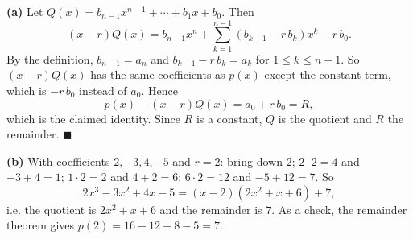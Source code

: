 \textbf{(a)} Let $Q(x)=b_{n-1}x^{n-1}+\cdots+b_1x+b_0$. Then
\[(x-r)Q(x)=b_{n-1}x^n+\sum_{k=1}^{n-1}\left(b_{k-1}-r\,b_k\right)x^k-r\,b_0.\]
By the definition, $b_{n-1}=a_n$ and $b_{k-1}-r\,b_k=a_k$ for $1\le k\le n-1$. So $(x-r)Q(x)$ has the same coefficients as $p(x)$ except the constant term, which is $-r\,b_0$ instead of $a_0$. Hence
\[p(x)-(x-r)Q(x)=a_0+r\,b_0=R,\]
which is the claimed identity. Since $R$ is a constant, $Q$ is the quotient and $R$ the remainder. $\blacksquare$

\textbf{(b)} With coefficients $2,-3,4,-5$ and $r=2$: bring down $2$; $2\cdot2=4$ and $-3+4=1$; $1\cdot2=2$ and $4+2=6$; $6\cdot2=12$ and $-5+12=7$. So
\[2x^3-3x^2+4x-5=(x-2)\left(2x^2+x+6\right)+7,\]
i.e. the quotient is $\boxed{2x^2+x+6}$ and the remainder is $\boxed{7}$. As a check, the remainder theorem gives $p(2)=16-12+8-5=7$.
